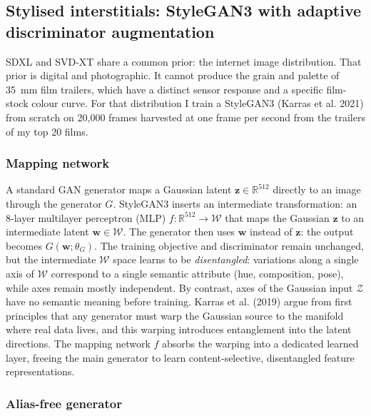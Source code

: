 \documentclass{article}
\begin{document}
\subsection{Stylised interstitials: StyleGAN3 with adaptive discriminator augmentation}

SDXL and SVD-XT share a common prior: the internet image distribution. That prior is digital and photographic. It cannot produce the grain and palette of 35~mm film trailers, which have a distinct sensor response and a specific film-stock colour curve. For that distribution I train a StyleGAN3 (Karras et al. 2021) from scratch on 20{,}000 frames harvested at one frame per second from the trailers of my top 20 films.

\subsubsection*{Mapping network}

A standard GAN generator maps a Gaussian latent $\mathbf{z} \in \mathbb{R}^{512}$ directly to an image through the generator $G$. StyleGAN3 inserts an intermediate transformation: an 8-layer multilayer perceptron (MLP) $f: \mathbb{R}^{512} \to \mathcal{W}$ that maps the Gaussian $\mathbf{z}$ to an intermediate latent $\mathbf{w} \in \mathcal{W}$. The generator then uses $\mathbf{w}$ instead of $\mathbf{z}$: the output becomes $G(\mathbf{w}; \theta_G)$. The training objective and discriminator remain unchanged, but the intermediate $\mathcal{W}$ space learns to be \emph{disentangled}: variations along a single axis of $\mathcal{W}$ correspond to a single semantic attribute (hue, composition, pose), while axes remain mostly independent. By contrast, axes of the Gaussian input $\mathcal{Z}$ have no semantic meaning before training. Karras et al. (2019) argue from first principles that any generator must warp the Gaussian source to the manifold where real data lives, and this warping introduces entanglement into the latent directions. The mapping network $f$ absorbs the warping into a dedicated learned layer, freeing the main generator to learn content-selective, disentangled feature representations.

\subsubsection*{Alias-free generator}
\end{document}
